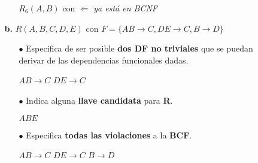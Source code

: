 \documentclass[12pt, letterpaper]{article}
\begin{document}
\begin{itemize}
\begin{itemize}
\begin{itemize}
                                            $R_{6}(A,B)$ con  \checkmark $\Leftarrow$ \textit{ya está en BCNF}

                    \end{itemize} \vspace{.3cm}

                \item[\textbf{b.}]  $R(A,B,C,D,E)$ con $F = \{AB\rightarrow C, 
                                    DE \rightarrow C, B \rightarrow D\}$

                    \begin{itemize}
                        
                        \item[$\bullet$]    Especifica de ser posible \textbf{dos 
                                            DF no triviales} que se puedan derivar 
                                            de las dependencias funcionales dadas.

                                            \begin{center}
                                                $AB \rightarrow C$ \hspace{.5cm} $DE \rightarrow C$
                                            \end{center}

                        \item[$\bullet$]    Indica alguna \textbf{llave candidata} 
                                            para \textbf{R}.

                                            \begin{center}
                                                $ABE$
                                            \end{center}

                        \item[$\bullet$]    Especifica \textbf{todas las violaciones} 
                                            a la \textbf{BCF}.

                                            \begin{center}
                                                $AB \rightarrow C$ \hspace{.5cm} $DE \rightarrow C$ \hspace{.5cm} $B \rightarrow D$
                                            \end{center}


\end{itemize}
\end{itemize}
\end{itemize}
\end{document}
